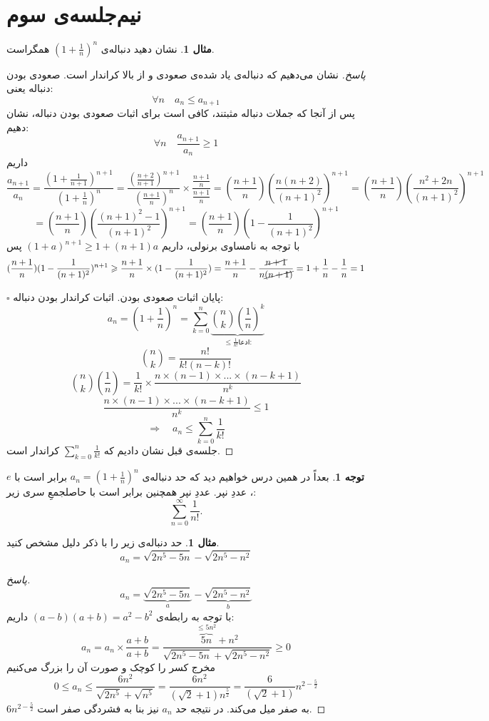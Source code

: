 \documentclass[12pt,a4paper]{article}
\theoremstyle{definition}
\newtheorem{mesal}[thm]{مثال}
\newtheorem{tav}[thm]{توجه}
\begin{document}
\section{نیم‌جلسه‌ی سوم}
\begin{mesal}
نشان دهید دنباله‌ی 
$(1+\frac{1}{n})^n$
همگراست.
\end{mesal}
\begin{proof}[پاسخ]
نشان می‌دهیم که دنباله‌ی یاد شده‌ی صعودی و از بالا کراندار است.
صعودی بودن دنباله یعنی:
\[
\forall n \quad a_n \leqslant a_{n+1}
\]
پس  از آنجا که جملات دنباله مثبتند،‌ کافی است برای اثبات صعودی بودن دنباله، نشان دهیم:
\[
\forall n \quad \frac{a_{n+1}}{a_n} \geqslant 1
\]
داریم
\[
\frac{a_{n+1}}{a_n}=
\frac{(1+\frac{1}{n+1})^{n+1}}{(1+\frac{1}{n})^n}=\frac{(\frac{n+2}{n+1})^{n+1}}{(\frac{n+1}{n})^n}\times \frac{\frac{n+1}{n}}{\frac{n+1}{n}}=(\frac{n+1}{n})(\frac{n(n+2)}{(n+1)^2})^{n+1}=(\frac{n+1}{n})(\frac{n^2+2n}{(n+1)^2})^{n+1}
\]
\[
=(\frac{n+1}{n})(\frac{(n+1)^2-1}{(n+1)^2})^{n+1}=(\frac{n+1}{n})(1-\frac{1}{(n+1)^2})^{n+1}
\]
با توجه به نامساوی برنولی، 
داریم
$(1+a)^{n+1} \geqslant 1+(n+1)a$
پس
\[
(\frac{n+1}{n})(1-\frac{1}{(n+1)^2})^{n+1} \geqslant \frac{n+1}{n} \times (1-\frac{1}{(n+1)^2}) =\frac{n+1}{n}-\frac{\cancel{n+1}}{n \cancel{(n+1)}}=1+\frac{1}{n}-\frac{1}{n}=1 
\]

\hfill $\square$
پایان اثبات صعودی بودن.
\newline 
اثبات کراندار بودن دنباله:
\[
a_n=(1+\frac{1}{n})^n=\sum_{k=0}^n \underbrace{\binom{n}{k} (\frac{1}{n})^k}_{\leqslant \frac{1}{k!}\text{ادعا:}}
\]
\[
\binom{n}{k}=\frac{n!}{k! (n-k)!}
\]
\[
\binom{n}{k} (\frac{1}{n})=\frac{1}{k!} \times \frac{n \times (n-1) \times ... \times (n-k+1)}{n^k}
\]
\[
\frac{n \times (n-1) \times ... \times (n-k+1)}{n^k} \leqslant 1
\]
\[
\Rightarrow \quad a_n \leqslant \sum_{k=0}^{n} \frac{1}{k!}
\]
جلسه‌ی قبل نشان دادیم که 
$\sum_{k=0}^{n} \frac{1}{k!}$
کراندار است.
\end{proof}
\begin{tav}
بعداً در همین درس خواهیم دید که حد دنباله‌ی
$a_n=(1+\frac{1}{n})^n$
برابر است با
$e$،
عددِ نپر. عددِ نپر همچنین برابر است با حاصلجمعِ سری زیر:
\[
\sum_{n=0}^\infty \frac{1}{n!}.
\]
\end{tav}
\begin{mesal}
حد دنباله‌ی زیر را با ذکر دلیل مشخص کنید.
\[
a_n=\sqrt{2n^5-5n}-\sqrt{2n^5-n^2}
\]
\end{mesal}
\begin{proof}[پاسخ]
\[
a_n=\underbrace{\sqrt{2n^5-5n}}_{a}-\underbrace{\sqrt{2n^5-n^2}}_b
\]
با توجه به رابطه‌ی 
$(a-b)(a+b)=a^2-b^2$
داریم:
\[
a_n=a_n \times \frac{a+b}{a+b}=\frac{\overbrace{5n}^{\leqslant 5n^2}+n^2}{\sqrt{2n^5-5n}+\sqrt{2n^5-n^2}} \geqslant 0
\]
مخرج کسر را کوچک و صورت آن را بزرگ می‌کنیم
\[
0 \leqslant a_n \leqslant \frac{6n^2}{\sqrt{2n^5}+\sqrt{n^5}}=\frac{6n^2}{(\sqrt{2}+1) n^{\frac{5}{2}}}=\frac{6}{(\sqrt{2}+1)}n^{2-\frac{5}{2}}
\]
$6n^{2-\frac{5}{2}}$
به صفر میل می‌کند. در نتیجه حد 
$a_n$
 نیز 
 بنا به فشردگی 
 صفر است. 
\end{proof}
\end{document}

